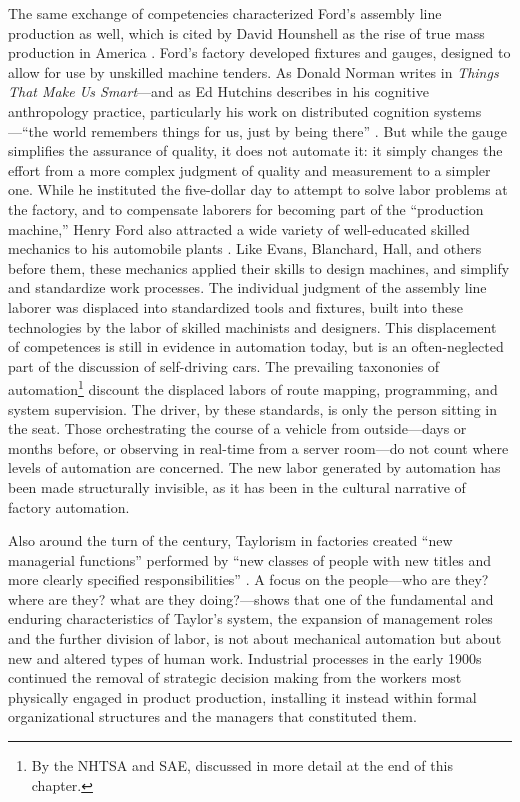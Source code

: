 The same exchange of competencies characterized Ford's assembly line
production as well, which is cited by David Hounshell as the rise of
true mass production in America \cite[p. 217]{hounshell}. Ford's factory developed fixtures
and gauges, designed to allow for use by unskilled machine tenders. As Donald
Norman writes in \emph{Things That Make Us Smart}---and as Ed
Hutchins describes in his cognitive anthropology practice,
particularly his work
on distributed cognition
systems \cite{hutchinsCockpit}---``the world remembers things for us, just by being
there'' \cite[p. 147]{normanThings}. But while the gauge simplifies the
assurance  of quality, it does not
automate it:  it simply changes the effort from a more complex judgment
of quality and measurement to a simpler one. While he instituted the
five-dollar day to attempt to solve labor problems at the factory, and to
compensate laborers for becoming part of the ``production machine,''
Henry Ford also attracted a wide variety of well-educated skilled mechanics
to his automobile plants \cite[p. 223]{hounshell}. Like Evans, Blanchard, Hall, and others
before them, these mechanics applied their skills to design machines,
and simplify and standardize work processes. The individual judgment
of the assembly line laborer was displaced into standardized tools and
fixtures, built into these technologies by the labor of skilled
machinists and designers. This displacement of competences is still in
evidence in automation today, but is an often-neglected part of the
discussion of self-driving cars. The prevailing taxononies of
automation\footnote{By the NHTSA and SAE, discussed in more detail at
  the end of this chapter.} discount the displaced labors of route
mapping, programming, and system supervision. The driver, by these
standards, is only the person sitting in the seat. Those orchestrating
the course of a vehicle from outside---days or months before, or
observing in real-time from a server room---do not count where levels of
automation are concerned. The new labor generated by automation has
been made structurally invisible, as it has been in the cultural
narrative of factory automation.

Also around the turn of the century, Taylorism in factories created ``new managerial
functions'' performed by ``new classes of people with new titles and
more clearly specified responsibilities'' \cite[p. 120]{aitken}. A focus on the
people---who are they? where are they? what are they doing?---shows that
one of the fundamental and enduring characteristics of Taylor's
system, the expansion of management roles and the further division of
labor, is not about mechanical automation but about new and altered
types of human work. Industrial processes in the early 1900s continued
the removal of strategic decision making from the
workers most physically engaged in product production, installing it
instead within formal organizational structures and the managers that
constituted them. 

